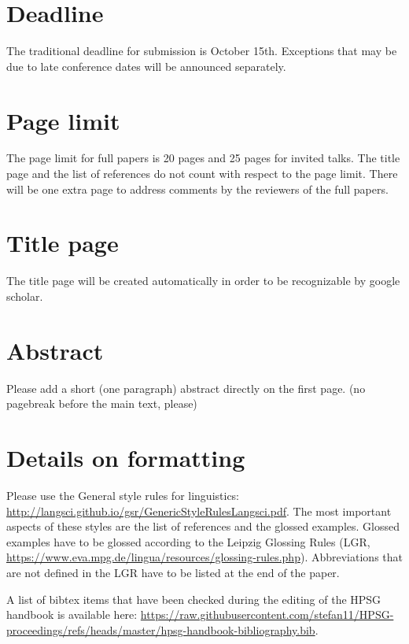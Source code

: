 \documentclass[11pt,a4paper,fleqn]{article}
\begin{document}
\section{Deadline}

The traditional deadline for submission is October 15th. Exceptions that may be due to late
conference dates will be announced separately.

\section{Page limit}

The page limit for full papers is 20 pages and 25 pages for invited talks. The title page and the
list of references do not count with respect to the page limit. There will be one extra page to
address comments by the reviewers of the full papers.


\section{Title page}


The title page will be created automatically in order to be recognizable by google scholar.

\section{Abstract}

Please add a short (one paragraph) abstract directly on the first page.
(no pagebreak before the main text, please)


\section{Details on formatting}

Please use the General style rules for linguistics:
\url{http://langsci.github.io/gsr/GenericStyleRulesLangsci.pdf}. The most important aspects of these
styles are the list of references and the glossed examples. Glossed examples have to be glossed
according to the Leipzig Glossing Rules (LGR,
\url{https://www.eva.mpg.de/lingua/resources/glossing-rules.php}). Abbreviations that are not
defined in the LGR have to be listed at the end of the paper.

A list of bibtex items that have been checked during the editing of the HPSG handbook is available
here:
\url{https://raw.githubusercontent.com/stefan11/HPSG-proceedings/refs/heads/master/hpsg-handbook-bibliography.bib}.
\end{document}
